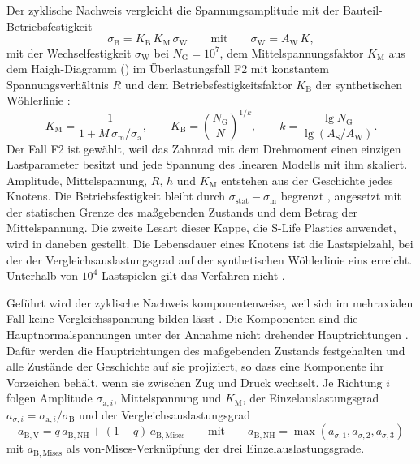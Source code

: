 Der zyklische Nachweis vergleicht die Spannungsamplitude mit der Bauteil-Betriebsfestigkeit
\begin{equation}
    \sigma_{\mathrm{B}} = K_{\mathrm{B}}\,K_{\mathrm{M}}\,\sigma_{\mathrm{W}} \qquad \text{mit} \qquad \sigma_{\mathrm{W}} = A_{\mathrm{W}}\,K ,
    \label{eq:betriebsfestigkeit}
\end{equation}
mit der Wechselfestigkeit $\sigma_{\mathrm{W}}$ bei $N_{\mathrm{G}} = 10^{7}$, dem Mittelspannungsfaktor $K_{\mathrm{M}}$ aus dem Haigh-Diagramm () im Überlastungsfall F2 mit konstantem Spannungsverhältnis $R$ und dem Betriebsfestigkeitsfaktor $K_{\mathrm{B}}$ der synthetischen Wöhlerlinie \cite[S.~360 bis 371]{Sto18}:
\begin{equation}
    K_{\mathrm{M}} = \frac{1}{1 + M\,\sigma_{\mathrm{m}}/\sigma_{\mathrm{a}}} , \qquad
    K_{\mathrm{B}} = \left(\frac{N_{\mathrm{G}}}{N}\right)^{1/k} , \qquad
    k = \frac{\lg N_{\mathrm{G}}}{\lg\left(A_{\mathrm{S}}/A_{\mathrm{W}}\right)} .
    \label{eq:k_m_k_b}
\end{equation}
Der Fall F2 ist gewählt, weil das Zahnrad mit dem Drehmoment einen einzigen Lastparameter besitzt und jede Spannung des linearen Modells mit ihm skaliert. Amplitude, Mittelspannung, $R$, $h$ und $K_{\mathrm{M}}$ entstehen aus der Geschichte jedes Knotens. Die Betriebsfestigkeit bleibt durch $\sigma_{\mathrm{stat}} - \sigma_{\mathrm{m}}$ begrenzt \cite[S.~372]{Sto18}, angesetzt mit der statischen Grenze des maßgebenden Zustands und dem Betrag der Mittelspannung. Die zweite Lesart dieser Kappe, die S-Life Plastics anwendet, wird in  daneben gestellt. Die Lebensdauer eines Knotens ist die Lastspielzahl, bei der der Vergleichsauslastungsgrad auf der synthetischen Wöhlerlinie eins erreicht. Unterhalb von $10^{4}$ Lastspielen gilt das Verfahren nicht \cite[S.~372]{Sto18}.

Geführt wird der zyklische Nachweis komponentenweise, weil sich im mehraxialen Fall keine Vergleichsspannung bilden lässt \cite[S.~368 und 373]{Sto18}. Die Komponenten sind die Hauptnormalspannungen unter der Annahme nicht drehender Hauptrichtungen \cite[S.~361]{Sto18}. Dafür werden die Hauptrichtungen des maßgebenden Zustands festgehalten und alle Zustände der Geschichte auf sie projiziert, so dass eine Komponente ihr Vorzeichen behält, wenn sie zwischen Zug und Druck wechselt. Je Richtung $i$ folgen Amplitude $\sigma_{\mathrm{a},i}$, Mittelspannung und $K_{\mathrm{M}}$, der Einzelauslastungsgrad $a_{\sigma,i} = \sigma_{\mathrm{a},i}/\sigma_{\mathrm{B}}$ und der Vergleichsauslastungsgrad \cite[S.~374]{Sto18}
\begin{equation}
    a_{\mathrm{B,V}} = q\,a_{\mathrm{B,NH}} + (1 - q)\,a_{\mathrm{B,Mises}} \qquad \text{mit} \qquad a_{\mathrm{B,NH}} = \max\left(a_{\sigma,1}, a_{\sigma,2}, a_{\sigma,3}\right)
    \label{eq:a_bv}
\end{equation}
mit $a_{\mathrm{B,Mises}}$ als von-Mises-Verknüpfung der drei Einzelauslastungsgrade.

